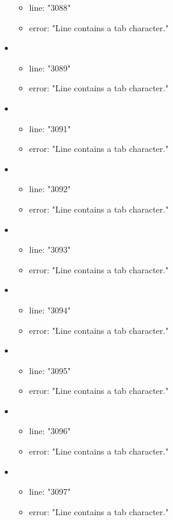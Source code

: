 \begin{itemize}
\begin{itemize}
		\item line: "3088" 
		\item error: "Line contains a tab character." 
	\end{itemize}
	\item 
	\begin{itemize} 
		\item line: "3089" 
		\item error: "Line contains a tab character." 
	\end{itemize}
	\item 
	\begin{itemize} 
		\item line: "3091" 
		\item error: "Line contains a tab character." 
	\end{itemize}
	\item 
	\begin{itemize} 
		\item line: "3092" 
		\item error: "Line contains a tab character." 
	\end{itemize}
	\item 
	\begin{itemize} 
		\item line: "3093" 
		\item error: "Line contains a tab character." 
	\end{itemize}
	\item 
	\begin{itemize} 
		\item line: "3094" 
		\item error: "Line contains a tab character." 
	\end{itemize}
	\item 
	\begin{itemize} 
		\item line: "3095" 
		\item error: "Line contains a tab character." 
	\end{itemize}
	\item 
	\begin{itemize} 
		\item line: "3096" 
		\item error: "Line contains a tab character." 
	\end{itemize}
	\item 
	\begin{itemize} 
		\item line: "3097" 
		\item error: "Line contains a tab character." 

\end{itemize}
\end{itemize}

